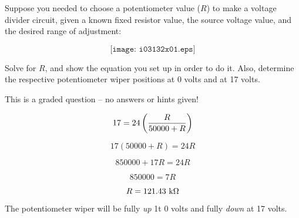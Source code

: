 

Suppose you needed to choose a potentiometer value ($R$) to make a voltage divider circuit, given a known fixed resistor value, the source voltage value, and the desired range of adjustment:

$$\texttt{[image: i03132x01.eps]}$$

Solve for $R$, and show the equation you set up in order to do it.  Also, determine the respective potentiometer wiper positions at 0 volts and at 17 volts.


\vfil 

\eject






This is a graded question -- no answers or hints given!







$$17 = 24 \left(R \over {50000 + R} \right)$$

$$17 (50000 + R) = 24R$$

$$850000 + 17R = 24R$$

$$850000 = 7R$$

$$R = 121.43 \hbox{ k} \Omega $$

\vskip 10pt

The potentiometer wiper will be fully {\it up} 1t 0 volts and fully {\it down} at 17 volts.




